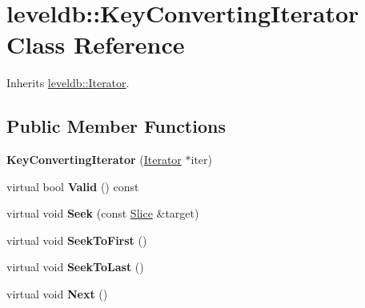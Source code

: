 \hypertarget{classleveldb_1_1_key_converting_iterator}{}\section{leveldb\+::Key\+Converting\+Iterator Class Reference}
\label{classleveldb_1_1_key_converting_iterator}


Inherits \mbox{\hyperlink{classleveldb_1_1_iterator}{leveldb\+::\+Iterator}}.

\subsection*{Public Member Functions}
\begin{DoxyCompactItemize}
\item 
\mbox{\label{classleveldb_1_1_key_converting_iterator_a7b5c28a94749f2e02ecc9021bb9adb51}} 
{\bfseries Key\+Converting\+Iterator} (\mbox{\hyperlink{classleveldb_1_1_iterator}{Iterator}} $\ast$iter)
\item 
\mbox{\label{classleveldb_1_1_key_converting_iterator_a28b6f61b9da28d26021854337d68d3f1}} 
virtual bool {\bfseries Valid} () const
\item 
\mbox{\label{classleveldb_1_1_key_converting_iterator_a6af9b763a5831c2fdcd8c3bebfef6ae4}} 
virtual void {\bfseries Seek} (const \mbox{\hyperlink{classleveldb_1_1_slice}{Slice}} \&target)
\item 
\mbox{\label{classleveldb_1_1_key_converting_iterator_a56a6b7b97747d5e33981a66c28670cc9}} 
virtual void {\bfseries Seek\+To\+First} ()
\item 
\mbox{\label{classleveldb_1_1_key_converting_iterator_a9db639879c442a67234fc345887b19fc}} 
virtual void {\bfseries Seek\+To\+Last} ()
\item 
\mbox{\label{classleveldb_1_1_key_converting_iterator_a6b468c158da3f6abbc697f7728811da8}} 
virtual void {\bfseries Next} ()
\item 
\mbox{\label{classleveldb_1_1_key_converting_iterator_adff607836b7b3d117a524b3d440bc55a}} 

\end{DoxyCompactItemize}

